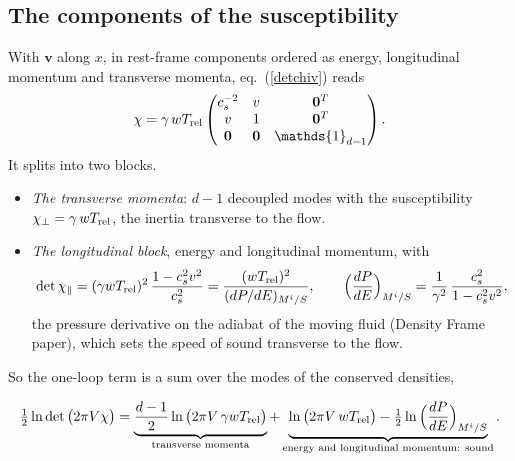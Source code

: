 \documentclass[11pt,aps,preprint,nofootinbib,superscriptaddress,tightenlines]{revtex4-2}
\newcommand{\one}{\mathds{1}}
\def\st{\begin{equation}}
\def\stp{\end{equation}}
\def\Eq#1{eq.~(\ref{#1})}
\begin{document}
\subsection{The components of the susceptibility}

With $\bm v$ along $x$, in rest-frame components ordered as energy, longitudinal momentum and transverse momenta, \Eq{detchiv} reads
\st
\chi=\gamma\,wT_{\rm rel}\begin{pmatrix}c_s^{-2} & v & \bm0^T\\ v & 1 & \bm0^T\\ \bm0 & \bm0 & \one_{d-1}\end{pmatrix} .
\stp
It splits into two blocks.
\begin{itemize}
\item \emph{The transverse momenta}: $d-1$ decoupled modes with the susceptibility $\chi_\perp=\gamma\,wT_{\rm rel}$, the inertia transverse to the flow.
\item \emph{The longitudinal block}, energy and longitudinal momentum, with
  \st
  \det\chi_\parallel=(\gamma wT_{\rm rel})^2\,\frac{1-c_s^2v^2}{c_s^2}=\frac{(wT_{\rm rel})^2}{(dP/dE)_{M^i/S}},\qquad
  \Big(\frac{dP}{dE}\Big)_{M^i/S}=\frac1{\gamma^2}\,\frac{c_s^2}{1-c_s^2v^2} ,
  \stp
  the pressure derivative on the adiabat of the moving fluid (Density Frame paper), which sets the speed of sound transverse to the flow.
\end{itemize}
So the one-loop term is a sum over the modes of the conserved densities,
\begin{keyeq}
\st
\tfrac12\ln\det\big(2\pi V\chi\big)=\underbrace{\frac{d-1}2\ln\big(2\pi V\,\gamma wT_{\rm rel}\big)}_{\text{transverse momenta}}
+\underbrace{\ln\big(2\pi V\,wT_{\rm rel}\big)-\tfrac12\ln\Big(\frac{dP}{dE}\Big)_{M^i/S}}_{\text{energy and longitudinal momentum: sound}} .
\label{modes}
\stp
\end{keyeq}
\end{document}
